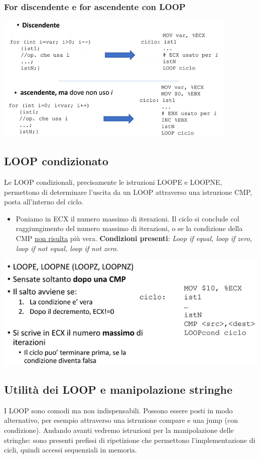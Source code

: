 \documentclass[11pt]{report}
\begin{document}
\subsubsection{For discendente e for ascendente con LOOP}
\begin{center}
\includegraphics{img/55.PNG}
\end{center}
\subsection{LOOP condizionato}
Le LOOP condizionali, precisamente le istruzioni LOOPE e LOOPNE, permettono di determinare l'uscita da un LOOP attraverso una istruzione CMP, posta all'interno del ciclo.
\begin{itemize}
\item Poniamo in ECX il numero massimo di iterazioni. Il ciclo si conclude col raggiungimento del numero massimo di iterazioni, o se la condizione della CMP \underline{non risulta} più vera. \textbf{Condizioni presenti}: \emph{Loop if equal, loop if zero, loop if not equal, loop if not zero}.
\end{itemize}
\begin{center}
\includegraphics{img/56.PNG}
\end{center}
\subsection{Utilità dei LOOP e manipolazione stringhe}
I LOOP sono comodi ma non indispensabili. Possono essere posti in modo alternativo, per esempio attraverso una istruzione compare e una jump (con condizione). Andando avanti vedremo istruzioni per la manipolazione delle stringhe: sono presenti prefissi di ripetizione che permettono l'implementazione di cicli, quindi accessi sequenziali in memoria.
\end{document}
